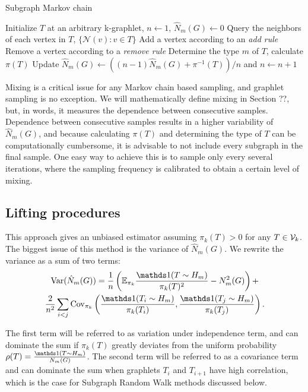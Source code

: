 \begin{algorithm}
\label{alg:SMC}
\caption{Subgraph Markov chain}
\begin{algorithmic}
  \STATE Initialize $T$ at an arbitrary k-graphlet, $n \gets 1$, $\hat N_m(G) \gets 0$
  \STATE Query the neighbors of each vertex in $T$, $\{\mathcal N (v): v \in T\}$
  \STATE Add a vertex according to an {\em add rule}
  \STATE Remove a vertex according to a {\em remove rule}
  \STATE Determine the type $m$ of $T$, calculate $\pi(T)$
  \STATE Update $\hat N_m(G) \gets ((n -1) \hat N_m(G) + \pi^{-1}(T))/n$ and $n \gets n + 1$
  \ENDIF
  \ENDWHILE
\end{algorithmic}
\end{algorithm}

Mixing is a critical issue for any Markov chain based sampling, and graphlet sampling is no exception.
We will mathematically define mixing in Section ??, but, in words, it measures the dependence between consecutive samples.
Dependence between consecutive samples results in a higher variability of $\hat N_m(G)$, and because calculating $\pi(T)$ and determining the type of $T$ can be computationally cumbersome, it is advisable to not include every subgraph in the final sample.
One easy way to achieve this is to sample only every several iterations, where the sampling frequency is calibrated to obtain a certain level of mixing.



{\bf }

\subsection{Lifting procedures}

    This approach gives an unbiased estimator assuming $\pi_k(T) >0$ for any $T\in \mathcal{V}_k$.
    The biggest issue of this method is the variance of $\hat N_m(G)$. We rewrite the variance as a sum of two terms:
	\begin{multline}
	\label{eq:variation}
		\Var(\hat N_m(G)) = \frac{1}{n}\left( \E_{\pi_k} \frac{\ind(T\sim H_m)}{\pi_k(T)^2} - N_m^2(G)\right) +\\
		\frac{2}{n^2} \sum_{i < j} \Cov_{\pi_k}\left( \frac{\ind(T_i\sim H_m)}{\pi_k(T_i)}, \frac{\ind(T_j\sim H_m)}{\pi_k(T_j)}\right).
	\end{multline}
	
	The first term will be referred to as variation under independence term, and can dominate the sum if $\pi_k(T)$ greatly deviates from the uniform probability $\rho(T) = \frac{\ind(T\sim H_m)}{N_m(G)}$.
	The second term will be referred to as a covariance term and can dominate the sum when graphlets $T_i$ and $T_{i+1}$ have high correlation, which is the case for Subgraph Random Walk methods discussed below.
	
